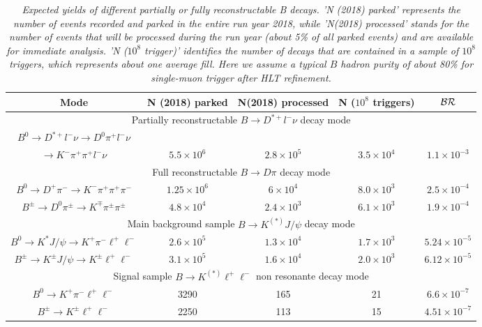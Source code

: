 \documentclass[a4paper,11pt]{article}
\begin{document}
\begin{table}[htb]
\footnotesize\center
\caption{\it Expected yields of different partially or fully reconstructable B decays.  'N (2018) parked' represents the number of events recorded and parked in the entire run year 2018, while 'N(2018) processed' stands for the number of events that will be processed during the run year (about 5\% of all parked events) and are available for immediate analysis. 'N ($10^8 $ trigger)' identifies the number of decays that are contained in a sample of $10^8$ triggers, which represents about one average fill. Here we assume a  typical $B$ hadron purity of about 80\% for single-muon trigger after HLT refinement.  \label{tab:yields}}
\vspace{0.1in}
\begin{tabular}{ |c|c|c|c|c| }
  \hline
Mode &  N (2018) parked & N(2018) processed & N ($10^8 $ triggers) & ${\cal BR}$  \\ \hline \hline

\multicolumn{5}{|c|}{ Partially reconstructable $B \rightarrow D^{*+} l^- \nu$  decay mode}\\ \hline
$B^0\rightarrow D^{*+} l^- \nu  \rightarrow D^0 \pi^+  l^- \nu$ & \multicolumn{3}{|c|}{} &  \\ 
$\rightarrow K^- \pi^+ \pi^+ l^- \nu$ &   $5.5\times10^6$ &   $2.8\times10^5$  & $3.5\times10^4$  & $  1.1\times10^{-3}$   \\ \hline \hline

\multicolumn{5}{|c|}{ Full reconstructable $B \rightarrow D \pi$  decay mode}\\ \hline
$B^0\rightarrow D^+ \pi^-  \rightarrow K^-  \pi^+  \pi^+ \pi^-$ &  $1.25\times10^6$   &  $6\times10^4$     & $8.0\times10^3$  & $ 2.5 \times 10^{-4}$   \\ \hline
$B^{\pm} \rightarrow D^0 \pi^{\pm} \rightarrow K^{\mp}  \pi^{\pm} \pi^{\pm}$ &   $4.8\times10^4$ &  $2.4\times10^3$& $6.1\times 10^{3}$   & $1.9\times 10^{-4}$  \\ \hline \hline

\multicolumn{5}{|c|}{ Main background sample $B \rightarrow K^{(*)} J/\psi $  decay mode}\\ \hline
$B^0\rightarrow K^*J/\psi  \rightarrow K^+ \pi^- \ell^+\ell^-$ &   $2.6\times10^5$ &   $1.3\times10^4$  & $1.7 \times 10^{3}$  & $ 5.24 \times 10^{-5}$   \\ \hline
$B^{\pm}\rightarrow K^{\pm} J/\psi \rightarrow  K^{\pm} \ell^+\ell^-$ &   $3.1\times10^5$&   $1.6\times10^4$ & $2.0\times 10^{3}$ & $6.12\times 10^{-5}$   \\ \hline \hline

\multicolumn{5}{|c|}{Signal sample $B \rightarrow K^{(*)}   \ell^+\ell^-$ non resonante decay mode}\\ \hline
$B^0\rightarrow K^+ \pi^- \ell^+\ell^-$ &   3290 &   165  & 21  & $6.6 \times 10^{-7}$  \\ \hline
$B^{\pm}\rightarrow K^{\pm} \ell^+\ell^-$ &   2250 &  113  & 15  & $4.51\times 10^{-7}$  \\ \hline


  \end{tabular}
\end{table}
\end{document}
